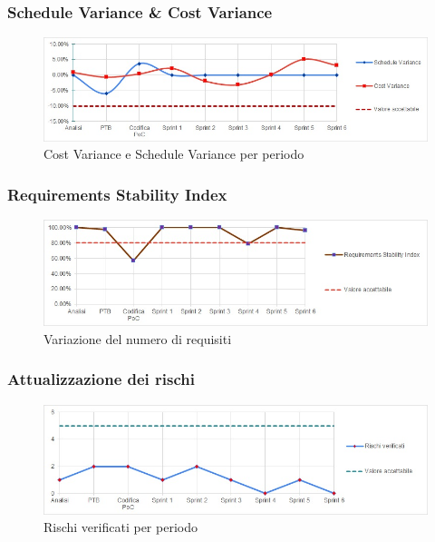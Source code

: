 \subsubsection{Schedule Variance \& Cost Variance}
\begin{figure}[H]
  \centering
  \includegraphics[scale=0.8]{immagini/sv_cv.jpg}
  \caption{Cost Variance e Schedule Variance per periodo}
\end{figure}

\subsubsection{Requirements Stability Index}
\begin{figure}[H]
  \centering
  \includegraphics[scale=0.8]{immagini/rsi.jpg}
  \caption{Variazione del numero di requisiti}
\end{figure}

\subsubsection{Attualizzazione dei rischi}
\begin{figure}[H]
  \centering
  \includegraphics[scale=0.8]{immagini/rischi.jpg}
  \caption{Rischi verificati per periodo}
\end{figure}

